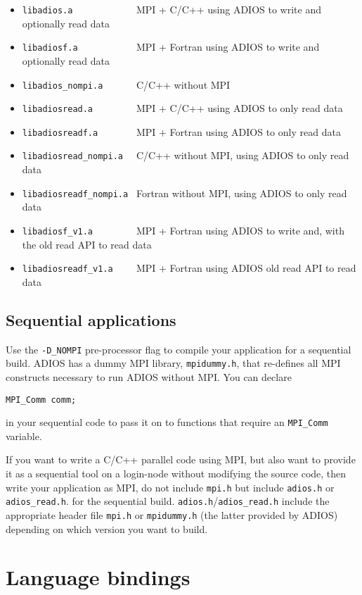 \begin{itemize}
\item \verb+libadios.a            +   MPI + C/C++ using ADIOS to write and optionally read data
\item \verb+libadiosf.a           +   MPI + Fortran using ADIOS to write and optionally read data
\item \verb+libadios_nompi.a      +   C/C++ without MPI
\item \verb+libadiosread.a        +   MPI + C/C++ using ADIOS to only read data
\item \verb+libadiosreadf.a       +   MPI + Fortran using ADIOS to only read data
\item \verb+libadiosread_nompi.a  +   C/C++ without MPI, using ADIOS to only read data
\item \verb+libadiosreadf_nompi.a +   Fortran without MPI, using ADIOS to only read data
\item \verb+libadiosf_v1.a        +   MPI + Fortran using ADIOS to write and, with the old read API to read data
\item \verb+libadiosreadf_v1.a    +   MPI + Fortran using ADIOS old read API to read data
\end{itemize}

\subsection{Sequential applications}

Use the \verb+-D_NOMPI+ pre-processor flag to compile your application 
for a sequential build. ADIOS has a dummy MPI library, \verb+mpidummy.h+, that re-defines 
all MPI constructs necessary to run ADIOS without MPI. You can declare

\verb+MPI_Comm comm;+

in your sequential code to pass it on to functions that require an \verb+MPI_Comm+ variable.

If you want to write a C/C++ parallel code using MPI, but also want to provide it as a
sequential tool on a login-node without modifying the source code, then write your 
application as MPI, do not include \verb+mpi.h+ but include 
\verb+adios.h+ or \verb+adios_read.h+.
for the sequential build.
\verb+adios.h+/\verb+adios_read.h+ include the appropriate header file 
\verb+mpi.h+ or \verb+mpidummy.h+ 
(the latter provided by ADIOS) depending on which version you want to build. 


\section{Language bindings}

